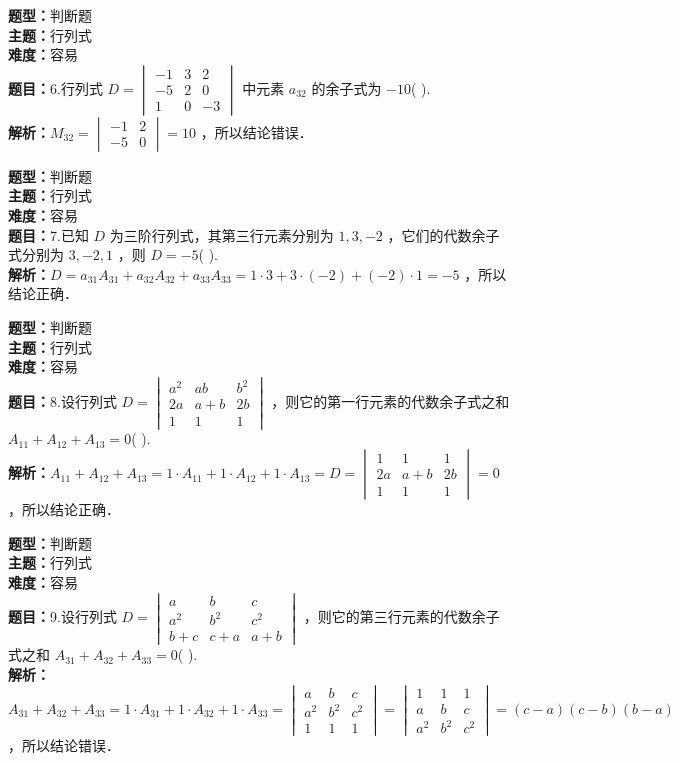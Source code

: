\documentclass{ctexart}
\newenvironment{question}[5]{%
	\noindent\textbf{题型：}#1\\
	\textbf{主题：}#2\\
	\textbf{难度：}#3\\
	\textbf{题目：}#4\\
	\textbf{解析：}#5\\
	\vspace{1em}
}{}
\begin{document}
	\begin{question}
		{判断题}
		{行列式}
		{容易}
		{6.行列式 \(D=\begin{vmatrix}-1 & 3 & 2 \\ -5 & 2 & 0 \\ 1 & 0 & -3\end{vmatrix}\) 中元素 \(a_{32}\) 的余子式为 \(-10\)(  ).}
		{\(M_{32}=\begin{vmatrix}-1 & 2 \\ -5 & 0\end{vmatrix}=10\) ，所以结论错误．}
	\end{question}
	
	\begin{question}
		{判断题}
		{行列式}
		{容易}
		{7.已知 \(D\) 为三阶行列式，其第三行元素分别为 \(1,3,-2\) ，它们的代数余子式分别为 \(3,-2,1\) ，则 \(D=-5\)(  ).}
		{\(D=a_{31} A_{31}+a_{32} A_{32}+a_{33} A_{33}=1 \cdot 3 + 3 \cdot (-2) + (-2) \cdot 1 = -5\) ，所以结论正确．}
	\end{question}
	
	\begin{question}
		{判断题}
		{行列式}
		{容易}
		{8.设行列式 \(D=\begin{vmatrix}a^2 & ab & b^2 \\ 2a & a+b & 2b \\ 1 & 1 & 1\end{vmatrix}\) ，则它的第一行元素的代数余子式之和 \(A_{11}+A_{12}+A_{13}=0\)(  ).}
		{\(A_{11}+A_{12}+A_{13}=1 \cdot A_{11} + 1 \cdot A_{12} + 1 \cdot A_{13} = D = \begin{vmatrix}1 & 1 & 1 \\ 2a & a+b & 2b \\ 1 & 1 & 1\end{vmatrix}=0\) ，所以结论正确．}
	\end{question}
	
	\begin{question}
		{判断题}
		{行列式}
		{容易}
		{9.设行列式 \(D=\begin{vmatrix}a & b & c \\ a^2 & b^2 & c^2 \\ b+c & c+a & a+b\end{vmatrix}\) ，则它的第三行元素的代数余子式之和 \(A_{31}+A_{32}+A_{33}=0\)(  ).}
		{\(A_{31}+A_{32}+A_{33}=1 \cdot A_{31}+1 \cdot A_{32}+1 \cdot A_{33} = \begin{vmatrix}a & b & c \\ a^2 & b^2 & c^2 \\ 1 & 1 & 1\end{vmatrix}=\begin{vmatrix}1 & 1 & 1 \\ a & b & c \\ a^2 & b^2 & c^2\end{vmatrix}=(c-a)(c-b)(b-a)\) ，所以结论错误．}
	\end{question}
	
\end{document}
